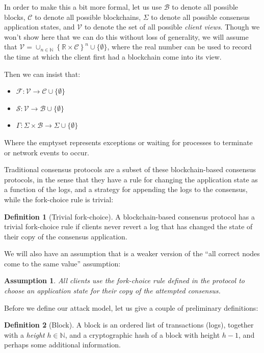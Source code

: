 \documentclass[11pt,a4paper]{article}
\theoremstyle{plain}
\newtheorem{assm}{Assumption}
\theoremstyle{definition}
\newtheorem{defn}{Definition}
\begin{document}
In order to make this a bit more formal, let us use $\mathcal{B}$ to denote all possible blocks, $\mathcal{C}$ to denote all possible blockchains, $\Sigma$ to denote all possible consensus application states, and $\mathcal{V}$ to denote the set of all possible \emph{client views}. Though we won't show here that we can do this without loss of generality, we will assume that $\mathcal{V} = \cup_{n \in \mathbb{N}}\left\{\mathbb{R} \times \mathcal{C}\right\}^n \cup \{\emptyset \}$, where the real number can be used to record the time at which the client first had a blockchain come into its view.

Then we can insist that:
\begin{itemize}
\item $\mathcal{F}:\mathcal{V} \to \mathcal{C} \cup \{\emptyset \}$
\item $\mathcal{S}:\mathcal{V} \to \mathcal{B} \cup \{\emptyset \}$
\item $\Gamma: \Sigma \times \mathcal{B} \to \Sigma \cup \{\emptyset \}$
\end{itemize}

Where the emptyset represents exceptions or waiting for processes to terminate or network events to occur.

Traditional consensus protocols are a subset of these blockchain-based consensus protocols, in the sense that they have a rule for changing the application state as a function of the logs, and a strategy for appending the logs to the consensus, while the fork-choice rule is trivial:

\begin{defn}[Trivial fork-choice]
A blockchain-based consensus protocol has a trivial fork-choice rule if clients never revert a log that has changed the state of their copy of the consensus application.
\end{defn}

We will also have an assumption that is a weaker version of the ``all correct nodes come to the same value'' assumption:

\begin{assm}
All clients use the fork-choice rule defined in the protocol to choose an application state for their copy of the attempted consensus.
\end{assm}

Before we define our attack model, let us give a couple of preliminary definitions:

\begin{defn}[Block]
A block is an ordered list of transactions (logs), together with a \emph{height} $h \in \mathbb{N}$, and a cryptographic hash of a block with height $h - 1$, and perhaps some additional information. 
\end{defn}
\end{document}
